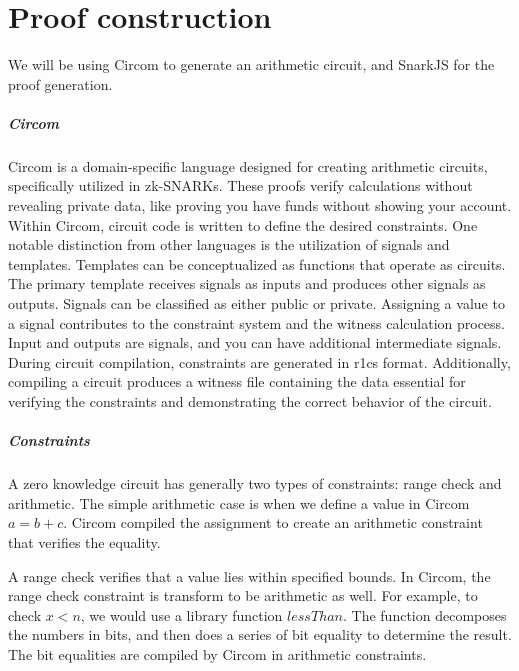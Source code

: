 
\chapter{Proof construction}
We will be using Circom to generate an arithmetic circuit, and SnarkJS for the proof generation.

\paragraph{Circom} 

Circom is a domain-specific language designed for creating arithmetic circuits, specifically utilized in zk-SNARKs. These proofs verify calculations without revealing private data, like proving you have funds without showing your account.
Within Circom, circuit code is written to define the desired constraints. One notable distinction from other languages is the utilization of signals and templates.
Templates can be conceptualized as functions that operate as circuits. The primary template receives signals as inputs and produces other signals as outputs. Signals can be classified as either public or private.
Assigning a value to a signal contributes to the constraint system and the witness calculation process.
Input and outputs are signals, and you can have additional intermediate signals.
During circuit compilation, constraints are generated in r1cs format. Additionally, compiling a circuit produces a witness file containing the data essential for verifying the constraints and demonstrating the correct behavior of the circuit.


\paragraph{Constraints} 

A zero knowledge circuit has generally two types of constraints: range check and arithmetic.
The simple arithmetic case is when we define a value in Circom $a = b + c$. Circom compiled the assignment to create an arithmetic constraint that verifies the equality.

A range check verifies that a value lies within specified bounds.
In Circom, the range check constraint is transform to be arithmetic as well. For example, to check $x<n$, we would use a library function $lessThan$.
The function decomposes the numbers in bits, and then does a series of bit equality to determine the result. The bit equalities are compiled by Circom in arithmetic constraints.

